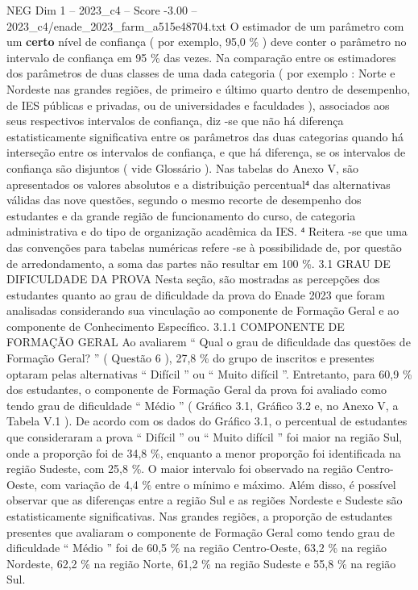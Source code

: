 \begin{textsample}{NEG Dim 1 – 2023\_c4 – Score -3.00 – 2023\_c4/enade\_2023\_farm\_a515e48704.txt}
O estimador de um parâmetro com um \textbf{certo} nível de confiança ( por exemplo, 95,0 \% ) deve conter o parâmetro no intervalo de confiança em 95 \% das vezes.
Na comparação entre os estimadores dos parâmetros de duas classes de uma dada categoria ( por exemplo : Norte e Nordeste nas grandes regiões, de primeiro e último quarto dentro de desempenho, de IES públicas e privadas, ou de universidades e faculdades ), associados aos seus respectivos intervalos de confiança, diz -se que não há diferença estatisticamente significativa entre os parâmetros das duas categorias quando há interseção entre os intervalos de confiança, e que há diferença, se os intervalos de confiança são disjuntos ( vide Glossário ).
Nas tabelas do Anexo V, são apresentados os valores absolutos e a distribuição percentual⁴ das alternativas válidas das nove questões, segundo o mesmo recorte de desempenho dos estudantes e da grande região de funcionamento do curso, de categoria administrativa e do tipo de organização acadêmica da IES. ⁴ Reitera -se que uma das convenções para tabelas numéricas refere -se à possibilidade de, por questão de arredondamento, a soma das partes não resultar em 100 \%. 3.1 GRAU DE DIFICULDADE DA PROVA Nesta seção, são mostradas as percepções dos estudantes quanto ao grau de dificuldade da prova do Enade 2023 que foram analisadas considerando sua vinculação ao componente de Formação Geral e ao componente de Conhecimento Específico. 3.1.1 COMPONENTE DE FORMAÇÃO GERAL Ao avaliarem “ Qual o grau de dificuldade das questões de Formação Geral? ” ( Questão 6 ), 27,8 \% do grupo de inscritos e presentes optaram pelas alternativas “ Difícil ” ou “ Muito difícil ”.
Entretanto, para 60,9 \% dos estudantes, o componente de Formação Geral da prova foi avaliado como tendo grau de dificuldade “ Médio ” ( Gráfico 3.1, Gráfico 3.2 e, no Anexo V, a Tabela V.1 ).
De acordo com os dados do Gráfico 3.1, o percentual de estudantes que consideraram a prova “ Difícil ” ou “ Muito difícil ” foi maior na região Sul, onde a proporção foi de 34,8 \%, enquanto a menor proporção foi identificada na região Sudeste, com 25,8 \%.
O maior intervalo foi observado na região Centro-Oeste, com variação de 4,4 \% entre o mínimo e máximo.
Além disso, é possível observar que as diferenças entre a região Sul e as regiões Nordeste e Sudeste são estatisticamente significativas.
Nas grandes regiões, a proporção de estudantes presentes que avaliaram o componente de Formação Geral como tendo grau de dificuldade “ Médio ” foi de 60,5 \% na região Centro-Oeste, 63,2 \% na região Nordeste, 62,2 \% na região Norte, 61,2 \% na região Sudeste e 55,8 \% na região Sul.

\end{textsample}
